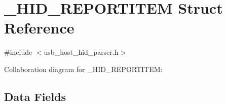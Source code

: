 \hypertarget{struct___h_i_d___r_e_p_o_r_t_i_t_e_m}{}\section{\+\_\+\+H\+I\+D\+\_\+\+R\+E\+P\+O\+R\+T\+I\+T\+E\+M Struct Reference}
\label{struct___h_i_d___r_e_p_o_r_t_i_t_e_m}


{\ttfamily \#include $<$usb\+\_\+host\+\_\+hid\+\_\+parser.\+h$>$}



Collaboration diagram for \+\_\+\+H\+I\+D\+\_\+\+R\+E\+P\+O\+R\+T\+I\+T\+E\+M\+:
\subsection*{Data Fields}
